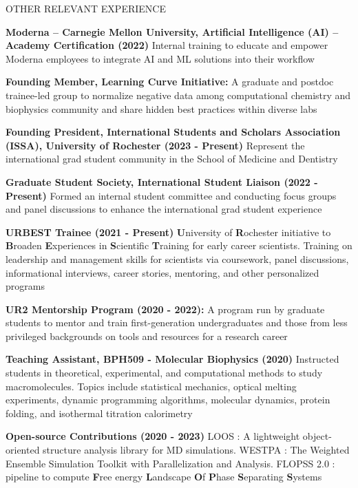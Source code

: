 \documentclass{resume} %
\begin{document}

\begin{rSection}{OTHER RELEVANT EXPERIENCE}
   \vspace{-1.25em}
   \item \textbf{Moderna – Carnegie Mellon University, Artificial Intelligence (AI) – Academy Certification (2022)} {
      Internal training to educate and empower Moderna employees to integrate AI and ML solutions into their workflow}
   \item \textbf{Founding Member,  Learning Curve Initiative:} {A graduate and postdoc trainee-led group to normalize negative data among computational chemistry and biophysics community and share hidden best practices within diverse labs}
   \item \textbf{Founding President, International Students and Scholars Association (ISSA), University of Rochester (2023 - Present)} {Represent the international grad student community in the School of Medicine and Dentistry}
   \item \textbf{Graduate Student Society, International Student Liaison (2022 - Present)} {Formed an internal student committee and conducting focus groups and panel discussions to enhance the international grad student experience}
   \item \textbf{URBEST Trainee (2021 - Present)} {\textbf{U}niversity of \textbf{R}ochester initiative to \textbf{B}roaden \textbf{E}xperiences in \textbf{S}cientific \textbf{T}raining for early career scientists. Training on leadership and management skills for scientists via coursework, panel discussions, informational interviews, career stories, mentoring, and other personalized programs}
   \item \textbf{UR2 Mentorship Program (2020 - 2022):} {A program run by graduate students to mentor and train first-generation undergraduates and those from less privileged backgrounds on tools and resources for a research career}
   \item \textbf{Teaching Assistant, BPH509 - Molecular Biophysics (2020)} {Instructed students in theoretical, experimental, and computational methods to study macromolecules. Topics include statistical mechanics, optical melting experiments, dynamic
      programming algorithms, molecular dynamics, protein folding, and isothermal titration calorimetry
   }
   \item \textbf{Open-source Contributions (2020 - 2023)} LOOS : A lightweight object-oriented structure analysis library for MD simulations.
   WESTPA : The Weighted Ensemble Simulation Toolkit with Parallelization and Analysis. FLOPSS 2.0 : pipeline to compute \textbf{F}ree energy \textbf{L}andscape \textbf{O}f \textbf{P}hase \textbf{S}eparating \textbf{S}ystems
\end{rSection}
\end{document}
